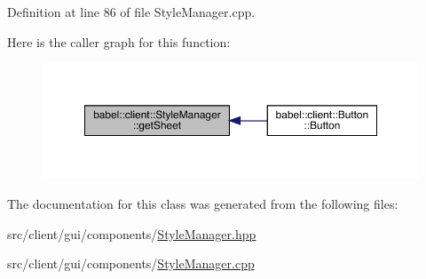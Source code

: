 Definition at line 86 of file Style\+Manager.\+cpp.

Here is the caller graph for this function\+:\nopagebreak
\begin{figure}[H]
\begin{center}
\leavevmode
\includegraphics[width=350pt]{classbabel_1_1client_1_1_style_manager_ad4989b460da50299c8aecb2d4249a912_icgraph}
\end{center}
\end{figure}


The documentation for this class was generated from the following files\+:\begin{DoxyCompactItemize}
\item 
src/client/gui/components/\mbox{\hyperlink{_style_manager_8hpp}{Style\+Manager.\+hpp}}\item 
src/client/gui/components/\mbox{\hyperlink{_style_manager_8cpp}{Style\+Manager.\+cpp}}\end{DoxyCompactItemize}
